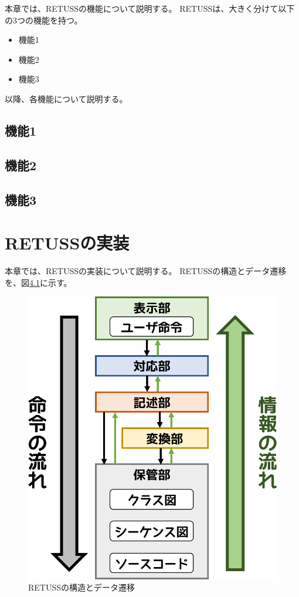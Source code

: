 \documentclass[uplatex, report, a4j, 10pt]{jsbook}
\newcommand{\tool}{RETUSS}
\begin{document}
本章では、\tool{}の機能について説明する。
\tool{}は、大きく分けて以下の3つの機能を持つ。

\begin{itemize}
	\item 機能1
	\item 機能2
	\item 機能3
\end{itemize}

以降、各機能について説明する。



\section{機能1}

\section{機能2}
\section{機能3}

\chapter{\tool{}の実装}\label{cha:Implementation}

本章では、\tool{}の実装について説明する。
\tool{}の構造とデータ遷移を、図\ref{fig:toolStructure}に示す。

\begin{figure}[tp]
	\centering
	\includegraphics[keepaspectratio, width=160mm]{figs/retussStructure}
	\caption{\tool{}の構造とデータ遷移}
	\label{fig:toolStructure}
\end{figure}
\end{document}
